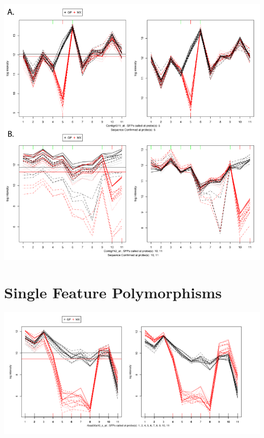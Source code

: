 \documentclass[pdf]{beamer}
\begin{document}
\begin{frame}[allowframebreaks]
\begin{center}
\includegraphics[scale=0.5]{figures/Figure1-SFP_plots.pdf} 
\end{center}
\end{frame}

\section{Single Feature Polymorphisms}
\begin{frame}[allowframebreaks]
\begin{center}
\includegraphics[scale=0.6]{figures/Figure6-SFPShiftedExp.pdf} 
\end{center}
\end{frame}
\end{document}
